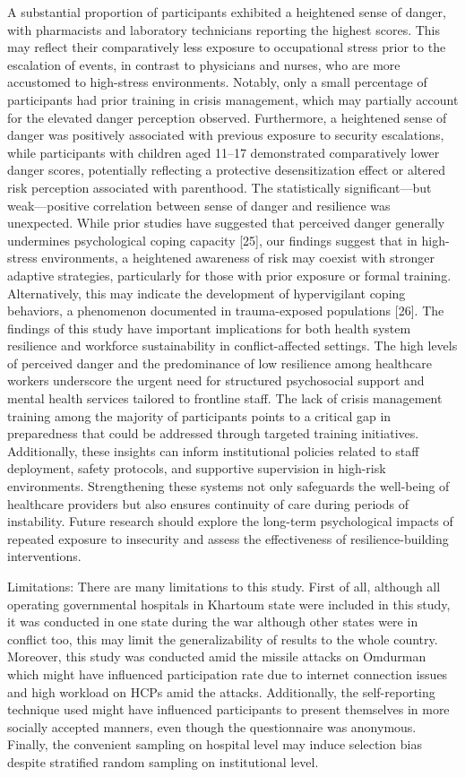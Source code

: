 A substantial proportion of participants exhibited a heightened sense of danger, with pharmacists and laboratory technicians reporting the highest scores. This may reflect their comparatively less exposure to occupational stress prior to the escalation of events, in contrast to physicians and nurses, who are more accustomed to high-stress environments. Notably, only a small percentage of participants had prior training in crisis management, which may partially account for the elevated danger perception observed. Furthermore, a heightened sense of danger was positively associated with previous exposure to security escalations, while participants with children aged 11–17 demonstrated comparatively lower danger scores, potentially reflecting a protective desensitization effect or altered risk perception associated with parenthood.
The statistically significant—but weak—positive correlation between sense of danger and resilience was unexpected. While prior studies have suggested that perceived danger generally undermines psychological coping capacity [25], our findings suggest that in high-stress environments, a heightened awareness of risk may coexist with stronger adaptive strategies, particularly for those with prior exposure or formal training. Alternatively, this may indicate the development of hypervigilant coping behaviors, a phenomenon documented in trauma-exposed populations [26].
The findings of this study have important implications for both health system resilience and workforce sustainability in conflict-affected settings. The high levels of perceived danger and the predominance of low resilience among healthcare workers underscore the urgent need for structured psychosocial support and mental health services tailored to frontline staff. The lack of crisis management training among the majority of participants points to a critical gap in preparedness that could be addressed through targeted training initiatives. Additionally, these insights can inform institutional policies related to staff deployment, safety protocols, and supportive supervision in high-risk environments. Strengthening these systems not only safeguards the well-being of healthcare providers but also ensures continuity of care during periods of instability. Future research should explore the long-term psychological impacts of repeated exposure to insecurity and assess the effectiveness of resilience-building interventions.

Limitations: 
There are many limitations to this study. First of all, although all operating governmental hospitals in Khartoum state were included in this study, it was conducted in one state during the war although other states were in conflict too, this may limit the generalizability of results to the whole country. 
Moreover, this study was conducted amid the missile attacks on Omdurman which might have influenced participation rate due to internet connection issues and high workload on HCPs amid the attacks. Additionally, the self-reporting technique used might have influenced participants to present themselves in more socially accepted manners, even though the questionnaire was anonymous.
Finally, the convenient sampling on hospital level may induce selection bias despite stratified random sampling on institutional level. 

